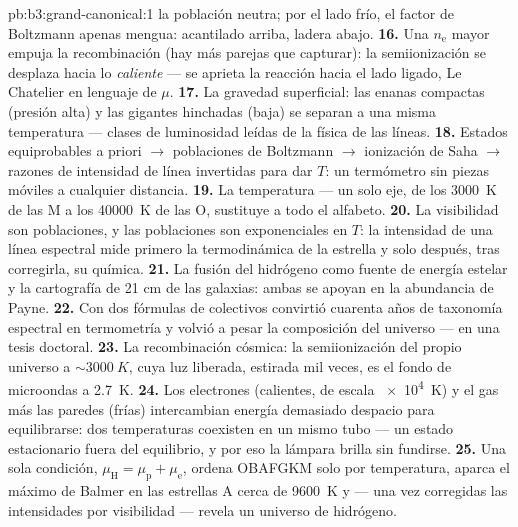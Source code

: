 \begin{solution}{pb:b3:grand-canonical:1}
la población neutra; por el lado frío, el factor de Boltzmann
apenas mengua: acantilado arriba, ladera abajo.
\textbf{16.} Una $n_{\text{e}}$ mayor empuja la recombinación (hay más
parejas que capturar): la semiionización se desplaza hacia lo
\emph{caliente} --- se aprieta la reacción hacia el lado ligado, Le
Chatelier en lenguaje de $\mu$.
\textbf{17.} La gravedad superficial: las enanas compactas (presión alta) y
las gigantes hinchadas (baja) se separan a una misma temperatura --- clases
de luminosidad leídas de la física de las líneas.
\textbf{18.} Estados equiprobables a priori $\to$ poblaciones de Boltzmann
$\to$ ionización de Saha $\to$ razones de intensidad de línea invertidas para
dar $T$: un termómetro sin piezas móviles a cualquier distancia.
\textbf{19.} La temperatura --- un solo eje, de los \qty{3000}{K} de las M a
los \qty{40000}{K} de las O, sustituye a todo el alfabeto.
\textbf{20.} La visibilidad son poblaciones, y las poblaciones son
exponenciales en $T$: la intensidad de una línea espectral mide primero la
termodinámica de la estrella y solo después, tras corregirla, su
química.
\textbf{21.} La fusión del hidrógeno como fuente de energía estelar y
la cartografía de 21 cm de las galaxias: ambas se apoyan en la
abundancia de Payne.
\textbf{22.} Con dos fórmulas de colectivos convirtió cuarenta años
de taxonomía espectral en termometría y volvió a pesar la
composición del universo --- en una tesis doctoral.
\textbf{23.} La recombinación cósmica: la semiionización del propio
universo a $\sim\qty{3000}{K}$, cuya luz liberada,
estirada mil veces, es el fondo de microondas a
\qty{2.7}{K}.
\textbf{24.} Los electrones (calientes, de escala \qty{e4}{K}) y el gas
más las paredes (frías) intercambian energía demasiado despacio para
equilibrarse: dos temperaturas coexisten en un mismo tubo --- un estado
estacionario fuera del equilibrio, y por eso la lámpara brilla sin fundirse.
\textbf{25.} Una sola condición, $\mu_{\text{H}} = \mu_{\text{p}} +
\mu_{\text{e}}$, ordena OBAFGKM solo por temperatura, aparca el
máximo de Balmer en las estrellas A cerca de \qty{9600}{K} y ---
una vez corregidas las intensidades por visibilidad --- revela un universo de
hidrógeno.
\end{solution}
